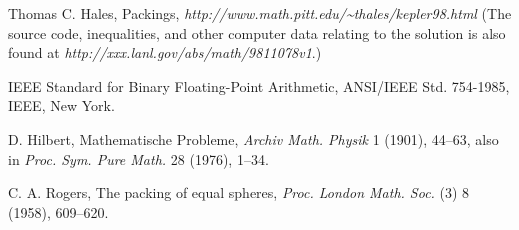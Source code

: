 \begin{thebibliography}{TCH97a}
 Thomas C. Hales, Packings, \hfill\break
    \hfill{\it http://www.math.pitt.edu/\~%
    \relax thales/kepler98.html} \hfil\break
     (The source code, inequalities,
    and other computer data relating to the solution is also found
    at {\it http://xxx.lanl.gov/abs/math/9811078v1}.)

 IEEE Standard for Binary Floating-Point
Arithmetic, ANSI/IEEE Std. 754-1985, IEEE, New York.

D. Hilbert, Mathematische Probleme, {\it Archiv Math. Physik} 1
(1901),
    44--63, also in {\it Proc. Sym. Pure Math.} 28 (1976), 1--34.

  C. A. Rogers, The packing of equal spheres, {\it Proc. London
Math.
    Soc.} (3) 8 (1958), 609--620.

\end{thebibliography}
